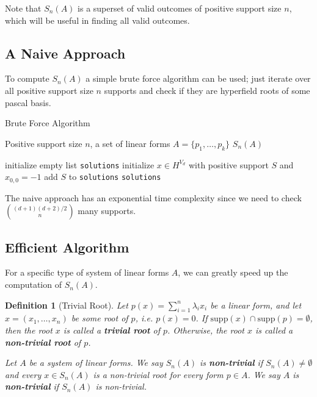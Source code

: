 \documentclass[11pt]{article}
\newtheorem{definition}[theorem]{Definition}
\begin{document}
Note that $S_{n}(A)$ is a superset of valid outcomes of positive support size $n$, which will be useful in finding all valid outcomes.

\subsection*{A Naive Approach}

To compute $S_{n}(A)$ a simple brute force algorithm can be used; just iterate over all positive support size $n$ supports and check if they are hyperfield roots of some pascal basis.

\begin{algorithm}
\caption{Brute Force Algorithm}\label{alg:hyperfield_criterion:brute_force}
  \begin{algorithmic}[1]
    \Require Positive support size $n$, a set of linear forms $A = \{ p_{1}, \dots, p_{k} \}$
    \Ensure $S_{n}(A)$

    \State initialize empty list \texttt{solutions}
      \State initialize $x \in H^{V_{d}}$ with positive support $S$ and $x_{0,0} = -1$ 
        \State add $S$ to \texttt{solutions}
      \EndIf
    \EndFor
    \State \Return \texttt{solutions}
    \EndFunction
  \end{algorithmic}  
\end{algorithm}

The naive approach has an exponential time complexity since we need to check $\binom{(d+1)(d + 2)/2}{n}$ many supports.

\subsection*{Efficient Algorithm}

For a specific type of system of linear forms $A$, we can greatly speed up the computation of $S_{n}(A)$.

\begin{definition}[Trivial Root]
  Let $p(x) = \sum_{i=1}^n \lambda_{i} x_{i}$ be a linear form, and let $x = (x_{1}, \dots, x_{n})$ be some root of $p$, i.e. $p(x) = 0$. If $\mathrm{supp}(x) \cap \mathrm{supp}(p) = \emptyset$, then the root $x$ is called a \textbf{trivial root} of $p$. Otherwise, the root $x$ is called a \textbf{non-trivial root} of $p$.

  Let $A$ be a system of linear forms. We say $S_{n}(A)$ is \textbf{non-trivial} if $S_{n}(A) \neq \emptyset$ and every $x \in S_{n}(A)$ is a non-trivial root for every form $p \in A$. We say $A$ is \textbf{non-trivial} if $S_{n}(A)$ is non-trivial.
\end{definition}
\end{document}
